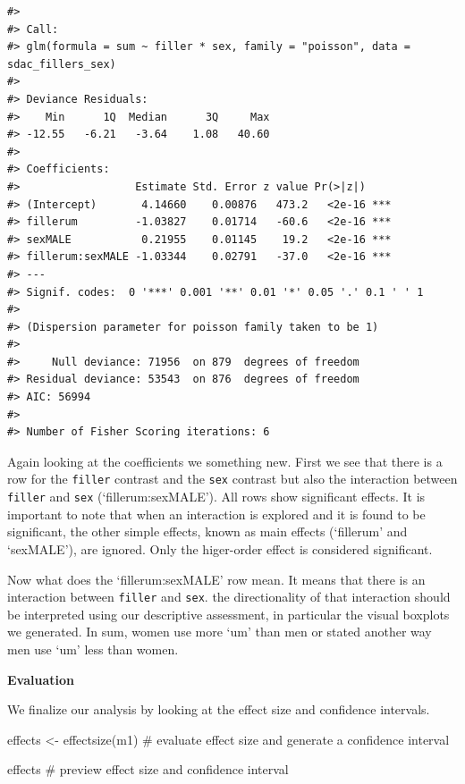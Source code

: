 \documentclass[
  letterpaper,
]{latex/krantz}
\newenvironment{Shaded}{\begin{snugshade}}{\end{snugshade}}
\newcommand{\CommentTok}[1]{\textcolor[rgb]{0.37,0.37,0.37}{#1}}
\newcommand{\FunctionTok}[1]{\textcolor[rgb]{0.28,0.35,0.67}{#1}}
\newcommand{\NormalTok}[1]{\textcolor[rgb]{0.00,0.23,0.31}{#1}}
\newcommand{\OtherTok}[1]{\textcolor[rgb]{0.00,0.23,0.31}{#1}}
\begin{document}
\begin{verbatim}
#> 
#> Call:
#> glm(formula = sum ~ filler * sex, family = "poisson", data = sdac_fillers_sex)
#> 
#> Deviance Residuals: 
#>    Min      1Q  Median      3Q     Max  
#> -12.55   -6.21   -3.64    1.08   40.60  
#> 
#> Coefficients:
#>                  Estimate Std. Error z value Pr(>|z|)    
#> (Intercept)       4.14660    0.00876   473.2   <2e-16 ***
#> fillerum         -1.03827    0.01714   -60.6   <2e-16 ***
#> sexMALE           0.21955    0.01145    19.2   <2e-16 ***
#> fillerum:sexMALE -1.03344    0.02791   -37.0   <2e-16 ***
#> ---
#> Signif. codes:  0 '***' 0.001 '**' 0.01 '*' 0.05 '.' 0.1 ' ' 1
#> 
#> (Dispersion parameter for poisson family taken to be 1)
#> 
#>     Null deviance: 71956  on 879  degrees of freedom
#> Residual deviance: 53543  on 876  degrees of freedom
#> AIC: 56994
#> 
#> Number of Fisher Scoring iterations: 6
\end{verbatim}

Again looking at the coefficients we something new. First we see that
there is a row for the \texttt{filler} contrast and the \texttt{sex}
contrast but also the interaction between \texttt{filler} and
\texttt{sex} (`fillerum:sexMALE'). All rows show significant effects. It
is important to note that when an interaction is explored and it is
found to be significant, the other simple effects, known as main effects
(`fillerum' and `sexMALE'), are ignored. Only the higer-order effect is
considered significant.

Now what does the `fillerum:sexMALE' row mean. It means that there is an
interaction between \texttt{filler} and \texttt{sex}. the directionality
of that interaction should be interpreted using our descriptive
assessment, in particular the visual boxplots we generated. In sum,
women use more `um' than men or stated another way men use `um' less
than women.

\textbf{Evaluation}

We finalize our analysis by looking at the effect size and confidence
intervals.

\begin{Shaded}
\begin{Highlighting}[]
\NormalTok{effects }\OtherTok{\textless{}{-}} \FunctionTok{effectsize}\NormalTok{(m1) }\CommentTok{\# evaluate effect size and generate a confidence interval}

\NormalTok{effects }\CommentTok{\# preview effect size and confidence interval}
\end{Highlighting}
\end{Shaded}
\end{document}
